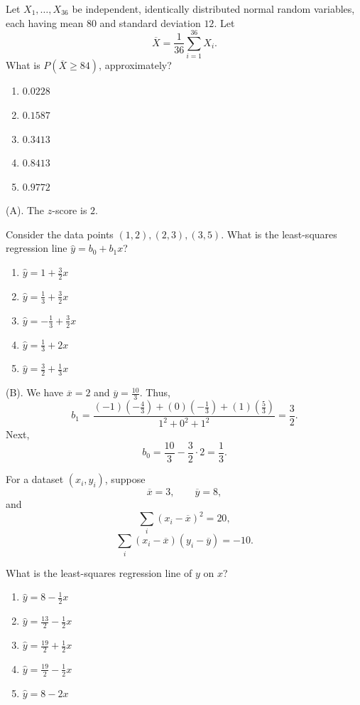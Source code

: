 \begin{exercise}
Let $X_1,\ldots,X_{36}$ be independent, identically distributed normal random variables, 
each having mean $80$ and standard deviation $12$.
Let
\[
\overline X=\frac1{36}\sum_{i=1}^{36}X_i.
\]
What is $P(\overline X\ge84)$, approximately?
\begin{enumerate}[label=(\Alph*)]
\item $0.0228$
\item $0.1587$
\item $0.3413$
\item $0.8413$
\item $0.9772$
\end{enumerate}
\end{exercise}
\begin{solution}
(A). The $z$-score is $2$.
\end{solution}

\begin{exercise}
Consider the data points $(1,2), (2,3),(3,5)$. 
What is the least-squares regression line $\widehat y=b_0+b_1x$?
\begin{enumerate}[label=(\Alph*)]
\item $\widehat y=1+\frac32x$
\item $\widehat y=\frac13+\frac32x$
\item $\widehat y=-\frac13+\frac32x$
\item $\widehat y=\frac13+2x$
\item $\widehat y=\frac32+\frac13x$
\end{enumerate}
\end{exercise}
\begin{solution}
(B). We have $\overline{x} = 2$ and $\overline{y} = \frac{10}{3}$. Thus, 
\[
b_1 = \frac{(-1)(-\frac{4}{3}) + (0)(-\frac{1}{3}) + (1)(\frac{5}{3})}{1^2 + 0^2 + 1^2} = \frac{3}{2}.
\]
Next, 
\[
b_0 = \frac{10}{3} - \frac{3}{2}\cdot 2 = \frac{1}{3}.
\]
\end{solution}

\begin{exercise}
For a dataset $(x_i,y_i)$, suppose
\[
\overline x=3,\qquad \overline y=8,
\]
and
\[
\sum_i(x_i-\overline x)^2=20,
\]
\[
\sum_i(x_i-\overline x)(y_i-\overline y)=-10.
\]

What is the least-squares regression line
of $y$ on $x$?

\begin{enumerate}[label=(\Alph*)]
\item $\widehat y=8-\frac12x$
\item $\widehat y=\frac{13}{2}-\frac12x$
\item $\widehat y=\frac{19}{2}+\frac12x$
\item $\widehat y=\frac{19}{2}-\frac12x$
\item $\widehat y=8-2x$
\end{enumerate}
\end{exercise}

